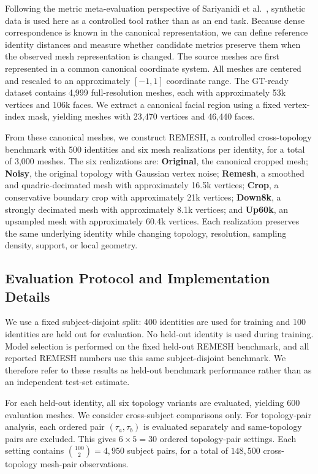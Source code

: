 \documentclass[10pt,twocolumn,letterpaper]{article}
\begin{document}
Following the metric meta-evaluation perspective of
Sariyanidi et al.~\cite{10448898}, synthetic data is used here as a controlled tool rather than as an end task. Because dense correspondence is known in the canonical representation, we can define reference identity distances and measure whether candidate metrics preserve them when the observed mesh representation is changed. The source meshes are first represented in a common canonical coordinate system. All meshes are centered and rescaled to an approximately $[-1,1]$ coordinate range. The GT-ready dataset contains 4,999 full-resolution meshes, each with approximately 53k vertices and 106k faces. We extract a canonical facial region using a fixed vertex-index mask, yielding meshes with 23,470 vertices and 46,440 faces.

From these canonical meshes, we construct REMESH, a controlled cross-topology benchmark with 500 identities and six mesh realizations per identity, for a total of 3,000 meshes. The six realizations are: \textbf{Original}, the canonical cropped mesh;
\textbf{Noisy}, the original topology with Gaussian vertex noise; 
\textbf{Remesh}, a smoothed and quadric-decimated mesh with approximately 16.5k vertices;
\textbf{Crop}, a conservative boundary crop with approximately 21k vertices;
\textbf{Down8k}, a strongly decimated mesh with approximately 8.1k vertices; and
\textbf{Up60k}, an upsampled mesh with approximately 60.4k vertices.
Each realization preserves the same underlying identity while changing topology, resolution, sampling density, support, or local geometry.

\subsection{Evaluation Protocol and Implementation Details}
\label{sec:evaluation_protocol}
We use a fixed subject-disjoint split: 400 identities are used for training and 100 identities are held out for evaluation. No held-out identity is used during training. Model selection is performed on the fixed held-out REMESH benchmark, and all reported REMESH numbers use this same subject-disjoint benchmark. We therefore refer to these results as held-out benchmark performance rather than as an independent test-set estimate.

For each held-out identity, all six topology variants are evaluated, yielding 600 evaluation meshes. We consider cross-subject comparisons only. For topology-pair analysis, each ordered pair $(\tau_a,\tau_b)$ is evaluated separately and same-topology pairs are excluded. This gives $6\times5=30$ ordered topology-pair settings. Each setting contains $\binom{100}{2}=4{,}950$ subject pairs, for a total of $148{,}500$ cross-topology mesh-pair observations.
\end{document}
